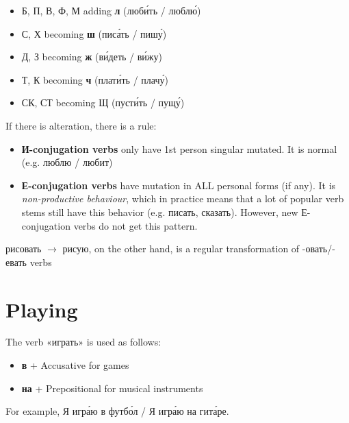 \begin{itemize}
\tightlist
\item
  Б, П, В, Ф, М adding \textbf{л} (люб\'{и}ть / любл\'{ю})
\item
  С, Х becoming \textbf{ш} (пис\'{а}ть / пиш\'{у})
\item
  Д, З becoming \textbf{ж} (в\'{и}деть / в\'{и}жу)
\item
  Т, К becoming \textbf{ч} (плат\'{и}ть / плач\'{у})
\item
  СК, СТ becoming Щ (пуст\'{и}ть / пущ\'{у})
\end{itemize}

If there is alteration, there is a rule:

\begin{itemize}
\tightlist
\item
  \textbf{И-conjugation verbs} only have 1st person singular mutated. It
  is normal (e.g. люблю / любит)
\item
  \textbf{Е-conjugation verbs} have mutation in ALL personal forms (if
  any). It is \emph{non-productive behaviour}, which in practice means
  that a lot of popular verb stems still have this behavior (e.g.
  писать, сказать). However, new Е-conjugation verbs do not get this
  pattern.
\end{itemize}

рисовать $ \rightarrow$ рисую, on the other hand, is a regular transformation of
-овать/-евать verbs

\section{Playing}\label{playing}

The verb «играть» is used as follows:

\begin{itemize}
\tightlist
\item
  \textbf{в} + Accusative for games
\item
  \textbf{на} + Prepositional for musical instruments
\end{itemize}

For example, Я игр\'{а}ю в футб\'{о}л / Я игр\'{а}ю на гит\'{а}ре.
